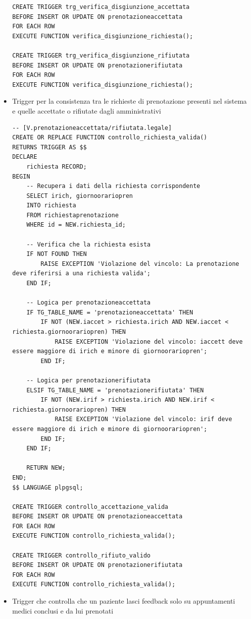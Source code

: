 \documentclass[12pt]{report}
\begin{document}
\begin{itemize}
\begin{lstlisting}
CREATE TRIGGER trg_verifica_disgiunzione_accettata
BEFORE INSERT OR UPDATE ON prenotazioneaccettata
FOR EACH ROW
EXECUTE FUNCTION verifica_disgiunzione_richiesta();

CREATE TRIGGER trg_verifica_disgiunzione_rifiutata
BEFORE INSERT OR UPDATE ON prenotazionerifiutata
FOR EACH ROW
EXECUTE FUNCTION verifica_disgiunzione_richiesta();
    \end{lstlisting}
\newpage
    \item Trigger per la consistenza tra le richieste di prenotazione presenti nel sistema e quelle accettate o rifiutate dagli amministrativi

    \begin{lstlisting}
-- [V.prenotazioneaccettata/rifiutata.legale]
CREATE OR REPLACE FUNCTION controllo_richiesta_valida()
RETURNS TRIGGER AS $$
DECLARE
    richiesta RECORD;
BEGIN
    -- Recupera i dati della richiesta corrispondente
    SELECT irich, giornoorariopren
    INTO richiesta
    FROM richiestaprenotazione
    WHERE id = NEW.richiesta_id;

    -- Verifica che la richiesta esista
    IF NOT FOUND THEN
        RAISE EXCEPTION 'Violazione del vincolo: La prenotazione deve riferirsi a una richiesta valida';
    END IF;

    -- Logica per prenotazioneaccettata
    IF TG_TABLE_NAME = 'prenotazioneaccettata' THEN
        IF NOT (NEW.iaccet > richiesta.irich AND NEW.iaccet < richiesta.giornoorariopren) THEN
            RAISE EXCEPTION 'Violazione del vincolo: iaccett deve essere maggiore di irich e minore di giornoorariopren';
        END IF;

    -- Logica per prenotazionerifiutata
    ELSIF TG_TABLE_NAME = 'prenotazionerifiutata' THEN
        IF NOT (NEW.irif > richiesta.irich AND NEW.irif < richiesta.giornoorariopren) THEN
            RAISE EXCEPTION 'Violazione del vincolo: irif deve essere maggiore di irich e minore di giornoorariopren';
        END IF;
    END IF;

    RETURN NEW;
END;
$$ LANGUAGE plpgsql;

CREATE TRIGGER controllo_accettazione_valida
BEFORE INSERT OR UPDATE ON prenotazioneaccettata
FOR EACH ROW
EXECUTE FUNCTION controllo_richiesta_valida();

CREATE TRIGGER controllo_rifiuto_valido
BEFORE INSERT OR UPDATE ON prenotazionerifiutata
FOR EACH ROW
EXECUTE FUNCTION controllo_richiesta_valida();
    \end{lstlisting}
\newpage
    \item Trigger che controlla che un paziente lasci feedback solo su appuntamenti medici conclusi e da lui prenotati


\end{itemize}
\end{document}
